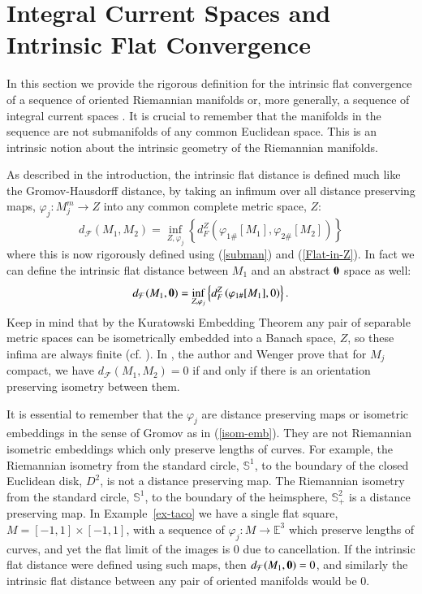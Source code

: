 \documentclass[12pt]{amsart}
\begin{document}
\vspace{.4cm}
\section{Integral Current Spaces and Intrinsic Flat Convergence}\label{sect-int-1}

In this section we provide the rigorous definition for the
intrinsic flat convergence of a sequence of oriented Riemannian
manifolds or, more generally, a sequence of integral current spaces
\cite{SorWen2}.   It is crucial to remember that the manifolds in the
sequence are not submanifolds of any common Euclidean space.  This
is an intrinsic notion about the intrinsic geometry of the Riemannian manifolds.

As described in the introduction, the intrinsic flat distance is
defined much like the Gromov-Hausdorff distance, by taking an
infimum over all distance preserving maps, $\varphi_j: M^m_j \to Z$
into any common complete metric
space, $Z$:
\begin{equation}
d_{\mathcal{F}}(M_1, M_2) = \inf_{Z, \varphi_j}\left\{ d_F^Z\left(\varphi_{1\#}[M_1], \varphi_{2\#}[M_2]\right)\right\}
\end{equation}
where this is now rigorously defined using (\ref{subman}) and (\ref{Flat-in-Z}).
In fact we can define the intrinsic flat distance between $M_1$ and
an abstract $\bf{0}$ space as well:
\begin{equation}
d_{\mathcal{F}}(M_1, {\bf{0}}) = \inf_{Z, \varphi_j}\left\{ d_F^Z\left(\varphi_{1\#}[M_1], 0\right)\right\}.
\end{equation}
Keep in mind that by the Kuratowski Embedding Theorem
any pair of separable metric spaces can be isometrically embedded
into a Banach space, $Z$, so these infima are always finite (cf. \cite{SorWen2}).
In \cite{SorWen2}, the author and Wenger prove that for $M_j$ compact, we have
$d_{\mathcal{F}}(M_1, M_2)=0$ if and only if there is an orientation
preserving isometry between them.

It is essential to remember that the $\varphi_j$ are distance preserving maps
or isometric embeddings in the sense of Gromov as in (\ref{isom-emb}).  
They are not Riemannian
isometric embeddings which only preserve lengths of curves.  For example,
the Riemannian isometry from the standard circle, ${\mathbb{S}}^1$, to the boundary of the closed Euclidean
disk, $D^2$, is not a distance preserving map.  The Riemannian isometry from the standard circle, $\mathbb{S}^1$, to the boundary of the heimsphere,
${\mathbb{S}}^2_+$ is a distance preserving map.   
In Example~\ref{ex-taco} we have a single flat square,
$M=[-1,1]\times [-1,1]$, with a sequence of $\varphi_j: M \to \mathbb{E}^3$
which preserve lengths of curves, and yet the flat limit of the images
is $0$ due to cancellation.   If the intrinsic flat distance were defined using
such maps, then  $d_{\mathcal{F}}(M_1, {\bf{0}})=0$, and similarly the
intrinsic flat distance between any pair of oriented manifolds would be $0$.
\end{document}
